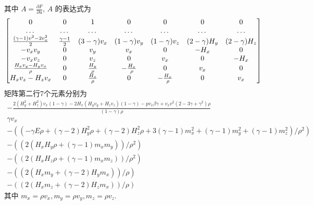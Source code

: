 \documentclass[10.5pt
]{article}
\begin{document}
其中 $A = \frac{\partial F}{\partial u}$, $A$ 的表达式为
\begin{equation}
   \mqty[
0  &  0  &  1  &  0  &  0  &  0  &  0 \\
\dots  &  \dots  &  \dots  &  \dots  &  \dots  &  \dots  &  \dots \\
\frac{(\gamma-1) v^2-2v_x^2}{2 }  &  \frac{\gamma-1}{2}  &  (3-\gamma) v_x  & (1-\gamma) v_y  &  (1-\gamma) v_z  &  (2-\gamma) H_y  &  (2-\gamma) H_z \\
-v_x v_y  &  0  &  v_y  &  v_x  &  0  &  -H_x  &  0 \\
-v_x v_z  &  0  &  v_z  &  0  &  v_x  &  0  &  -H_x \\
\frac{H_x v_y-H_y v_x}{\rho}  &  0  &  \frac{H_y}{\rho}  &  -\frac{H_x}{\rho}  &  0  &  v_x  &  0 \\
H_x v_z-H_z v_x  &  0  &  \frac{H_z}{\rho}  &  0  &  -\frac{H_x}{\rho}  &  0  &  v_x ]
\label{eq:Lax-Wendroff-A}
\end{equation}
矩阵第二行7个元素分别为
\begin{subequations}
	\begin{gather}
-\frac{2 (H_y^2+H_z^2) v_x (1- \gamma) -2 H_x (H_y v_y+H_z v_z )(1 - \gamma) - p v_x \beta \gamma + v_x v^2 (2 - 3 \gamma + \gamma^2) \rho}{(1 - \gamma) \rho}\\
  \gamma v_x   \\
  -((-\gamma E \rho+(\gamma-2) H_y^2 \rho+(\gamma-2) H_z^2 \rho+3 (\gamma-1) m_x^2+(\gamma-1) m_y^2+(\gamma-1) m_z^2)/\rho^2)   \\
  -((2 (H_x H_y \rho+(\gamma-1) m_x m_y))/\rho^2)   \\
  -((2 (H_x H_z \rho+(\gamma-1) m_x m_z))/\rho^2)   \\
  -((2 (H_x m_y+(\gamma-2) H_y m_x))/\rho)   \\
  -((2 (H_x m_z+(\gamma-2) H_z m_x))/\rho) 
\end{gather}
\end{subequations}
其中
$ m_x = \rho v_x,
m_y = \rho v_y,
m_z = \rho v_z.$
\end{document}

